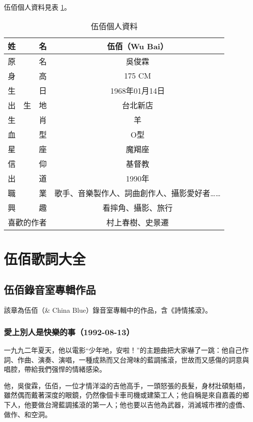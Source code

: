 \documentclass[UTF8,a4paper,oneside,twocolumn,12pt]{ctexbook}
\begin{document}
伍佰個人資料見表 \ref{tab:gerenziliao}。

\begin{table}[htbp]
	\caption{伍佰個人資料} \label{tab:gerenziliao}
	\centering
	\begin{tabular}{|c|c|}
		\hline
		姓　　　名 & 伍佰（Wu Bai） \\
		\hline
		原　　　名 & 吳俊霖 \\
		\hline
		身　　　高 & 175 CM \\
		\hline
		生　　　日 & 1968年01月14日 \\
		\hline
		出　生　地 & 台北新店 \\
		\hline
		生　　　肖 & 羊 \\
		\hline
		血　　　型 & O型 \\
		\hline
		星　　　座 & 魔羯座 \\
		\hline
		信　　　仰 & 基督教 \\
		\hline
		出　　　道 & 1990年 \\
		\hline
		職　　　業 & 歌手、音樂製作人、詞曲創作人、攝影愛好者…… \\
		\hline
		興　　　趣 & 看摔角、攝影、旅行 \\
		\hline
		喜歡的作者 & 村上春樹、史景遷 \\
		\hline
	\end{tabular}
\end{table}

\tableofcontents

\mainmatter

\twocolumn
\part{伍佰歌詞大全}
\chapter{伍佰錄音室專輯作品}
該章為伍佰（\& China Blue）錄音室專輯中的作品，含《詩情搖滾》。

\section*{愛上別人是快樂的事（1992-08-13）}
一九九二年夏天，他以電影“少年吔，安啦！”的主題曲把大家嚇了一跳：他自己作詞、作曲、演奏、演唱，一種成熟而又台灣味的藍調搖滾，世故而又感傷的詞意與唱腔，帶給我們强悍的情緒感染。

他，吳俊霖，伍佰，一位才情洋溢的吉他高手，一頭怒張的長髮，身材壯碩魁梧，雖然偶而戴著深度的眼鏡，仍然像個卡車司機或建築工人；他自稱是來自嘉義的鄉下人，他要做台灣藍調搖滾的第一人；他也要以吉他為武器，消滅城市裡的虛僑、做作、和空洞。
\end{document}
